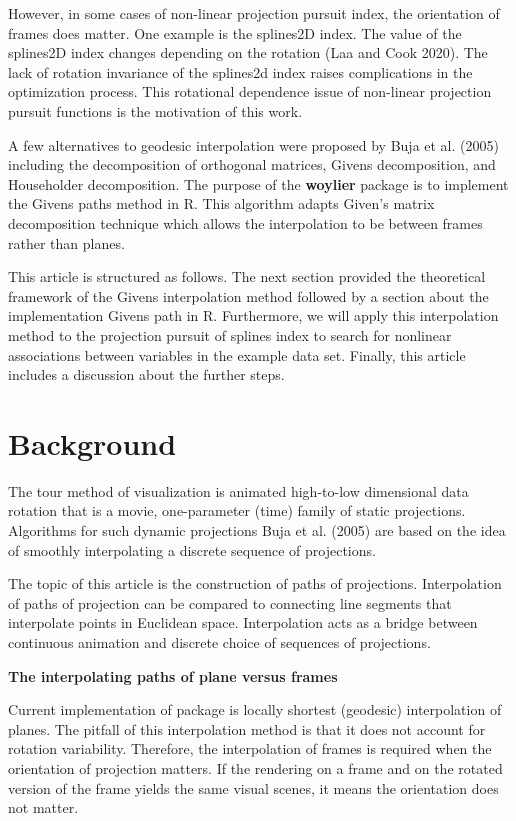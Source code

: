 However, in some cases of non-linear projection pursuit index, the orientation of frames does matter. One example is the splines2D index. The value of the splines2D index changes depending on the rotation (Laa and Cook 2020). The lack of rotation invariance of the splines2d index raises complications in the optimization process. This rotational dependence issue of non-linear projection pursuit functions is the motivation of this work.

A few alternatives to geodesic interpolation were proposed by Buja et al. (2005) including the decomposition of orthogonal matrices, Givens decomposition, and Householder decomposition. The purpose of the \textbf{woylier} package is to implement the Givens paths method in R. This algorithm adapts Given's matrix decomposition technique which allows the interpolation to be between frames rather than planes.

This article is structured as follows. The next section provided the theoretical framework of the Givens interpolation method followed by a section about the implementation Givens path in R. Furthermore, we will apply this interpolation method to the projection pursuit of splines index to search for nonlinear associations between variables in the example data set. Finally, this article includes a discussion about the further steps.

\hypertarget{background}{%
\section{Background}\label{background}}

The tour method of visualization is animated high-to-low dimensional data rotation that is a movie, one-parameter (time) family of static projections. Algorithms for such dynamic projections Buja et al. (2005) are based on the idea of smoothly interpolating a discrete sequence of projections.

The topic of this article is the construction of paths of projections. Interpolation of paths of projection can be compared to connecting line segments that interpolate points in Euclidean space. Interpolation acts as a bridge between continuous animation and discrete choice of sequences of projections.

\textbf{The interpolating paths of plane versus frames}

Current implementation of  package is locally shortest (geodesic) interpolation of planes. The pitfall of this interpolation method is that it does not account for rotation variability. Therefore, the interpolation of frames is required when the orientation of projection matters. If the rendering on a frame and on the rotated version of the frame yields the same visual scenes, it means the orientation does not matter.

